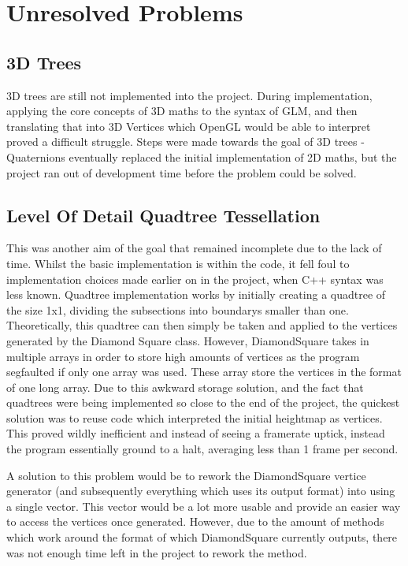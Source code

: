 \documentclass[a4paper,10pt]{report}
\begin{document}
\section{Unresolved Problems}
\subsection{3D Trees}
3D trees are still not implemented into the project. During implementation, applying the core concepts of 3D maths to the syntax of GLM, and then translating that into 3D Vertices which OpenGL would be able to interpret proved a difficult struggle. Steps were made towards the goal of 3D trees - Quaternions eventually replaced the initial implementation of 2D maths, but the project ran out of development time before the problem could be solved.

\subsection{Level Of Detail Quadtree Tessellation}
This was another aim of the goal that remained incomplete due to the lack of time. Whilst the basic implementation is within the code, it fell foul to implementation choices made earlier on in the project, when C++ syntax was less known. Quadtree implementation works by initially creating a quadtree of the size 1x1, dividing the subsections into boundarys smaller than one. Theoretically, this quadtree can then simply be taken and applied to the vertices generated by the Diamond Square class. However, DiamondSquare takes in multiple arrays in order to store high amounts of vertices as the program segfaulted if only one array was used. These array store the vertices in the format of one long array. Due to this awkward storage solution, and the fact that quadtrees were being implemented so close to the end of the project, the quickest solution was to reuse code which interpreted the initial heightmap as vertices. This proved wildly inefficient and instead of seeing a framerate uptick, instead the program essentially ground to a halt, averaging less than 1 frame per second. \medskip

A solution to this problem would be to rework the DiamondSquare vertice generator (and subsequently everything which uses its output format) into using a single vector. This vector would be a lot more usable and provide an easier way to access the vertices once generated. However, due to the amount of methods which work around the format of which DiamondSquare currently outputs, there was not enough time left in the project to rework the method. \medskip
\end{document}
